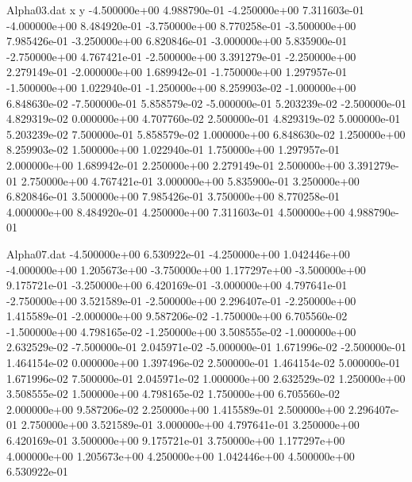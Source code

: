 \begin{filecontents}{Alpha03.dat}
x y
-4.500000e+00 4.988790e-01
-4.250000e+00 7.311603e-01
-4.000000e+00 8.484920e-01
-3.750000e+00 8.770258e-01
-3.500000e+00 7.985426e-01
-3.250000e+00 6.820846e-01
-3.000000e+00 5.835900e-01
-2.750000e+00 4.767421e-01
-2.500000e+00 3.391279e-01
-2.250000e+00 2.279149e-01
-2.000000e+00 1.689942e-01
-1.750000e+00 1.297957e-01
-1.500000e+00 1.022940e-01
-1.250000e+00 8.259903e-02
-1.000000e+00 6.848630e-02
-7.500000e-01 5.858579e-02
-5.000000e-01 5.203239e-02
-2.500000e-01 4.829319e-02
0.000000e+00 4.707760e-02
2.500000e-01 4.829319e-02
5.000000e-01 5.203239e-02
7.500000e-01 5.858579e-02
1.000000e+00 6.848630e-02
1.250000e+00 8.259903e-02
1.500000e+00 1.022940e-01
1.750000e+00 1.297957e-01
2.000000e+00 1.689942e-01
2.250000e+00 2.279149e-01
2.500000e+00 3.391279e-01
2.750000e+00 4.767421e-01
3.000000e+00 5.835900e-01
3.250000e+00 6.820846e-01
3.500000e+00 7.985426e-01
3.750000e+00 8.770258e-01
4.000000e+00 8.484920e-01
4.250000e+00 7.311603e-01
4.500000e+00 4.988790e-01
\end{filecontents}

\begin{filecontents}{Alpha07.dat}
-4.500000e+00 6.530922e-01
 -4.250000e+00 1.042446e+00
 -4.000000e+00 1.205673e+00
 -3.750000e+00 1.177297e+00
 -3.500000e+00 9.175721e-01
 -3.250000e+00 6.420169e-01
 -3.000000e+00 4.797641e-01
 -2.750000e+00 3.521589e-01
 -2.500000e+00 2.296407e-01
 -2.250000e+00 1.415589e-01
 -2.000000e+00 9.587206e-02
 -1.750000e+00 6.705560e-02
 -1.500000e+00 4.798165e-02
 -1.250000e+00 3.508555e-02
 -1.000000e+00 2.632529e-02
 -7.500000e-01 2.045971e-02
 -5.000000e-01 1.671996e-02
 -2.500000e-01 1.464154e-02
 0.000000e+00 1.397496e-02
 2.500000e-01 1.464154e-02
 5.000000e-01 1.671996e-02
 7.500000e-01 2.045971e-02
 1.000000e+00 2.632529e-02
 1.250000e+00 3.508555e-02
 1.500000e+00 4.798165e-02
 1.750000e+00 6.705560e-02
 2.000000e+00 9.587206e-02
 2.250000e+00 1.415589e-01
 2.500000e+00 2.296407e-01
 2.750000e+00 3.521589e-01
 3.000000e+00 4.797641e-01
 3.250000e+00 6.420169e-01
 3.500000e+00 9.175721e-01
 3.750000e+00 1.177297e+00
 4.000000e+00 1.205673e+00
 4.250000e+00 1.042446e+00
 4.500000e+00 6.530922e-01
\end{filecontents}

